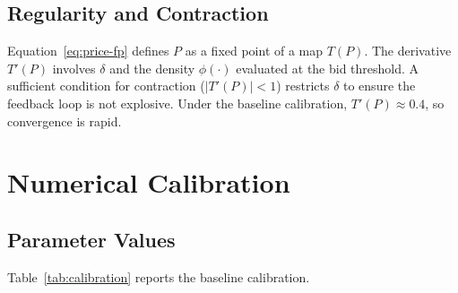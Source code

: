 \documentclass[11pt,a4paper]{article}
\newcommand{\1}{\mathbf{1}}
\begin{document}
\subsection{Regularity and Contraction}

Equation~\eqref{eq:price-fp} defines $P$ as a fixed point of a map
$T(P)$. The derivative $T'(P)$ involves $\delta$ and the
density $\phi(\cdot)$ evaluated at the bid threshold. A sufficient
condition for contraction ($|T'(P)| < 1$) restricts
$\delta$ to ensure the feedback loop is not explosive. Under the
baseline calibration, $T'(P) \approx 0.4$, so convergence is rapid.


\section{Numerical Calibration}

\subsection{Parameter Values}

Table~\ref{tab:calibration} reports the baseline calibration.
\end{document}
